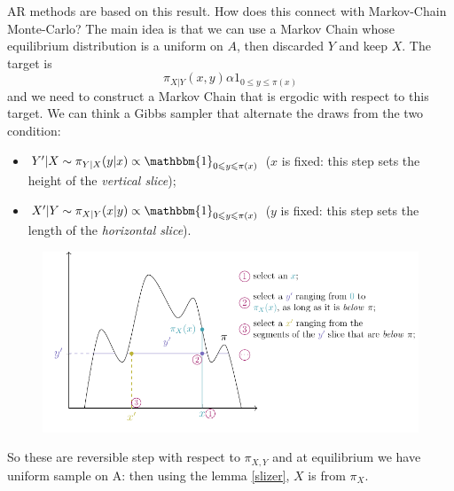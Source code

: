 \documentclass{article}
\begin{document}
   AR methods are based on this result. 
     How does this connect with Markov-Chain Monte-Carlo? The main idea is that we can use  a Markov Chain whose equilibrium distribution is a uniform on $A$, then discarded $Y$ and keep $X$. The target is \[\pi_{X|Y}(x,y) \alpha 1_{0 \leqslant y \leqslant \pi(x)} \] and we need to construct a Markov Chain that is ergodic with respect to this target.  We can think a Gibbs sampler that alternate the draws from the two condition:
    \begin{itemize}
        \item $Y'|X\sim \pi_{Y|X}(y|x)\propto\mathbbm{1}_{0\leqslant y\leqslant\pi(x)}$ ($x$ is fixed: this step sets the height of the \textit{vertical slice});
        \item $X'|Y\sim \pi_{X|Y}(x|y)\propto\mathbbm{1}_{0\leqslant y\leqslant\pi(x)}$ ($y$ is fixed: this step sets the length of the \textit{horizontal slice}).
    \end{itemize}
    \begin{figure}[H]
        \centering
        \includegraphics{standalones/pdfs/slicesampler}
        \label{slicesampler}
    \end{figure}
So these are reversible step with respect to $\pi_{X,Y}$ and at equilibrium we have uniform sample on A: then using the lemma \ref{slizer}, $X$ is from $\pi_X$.
\end{document}
